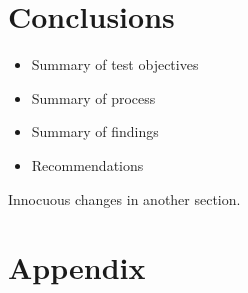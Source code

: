 \documentclass[conf]{new-aiaa}
\begin{document}
\section{Conclusions}

\begin{itemize}
	\item Summary of test objectives
	\item Summary of process
	\item Summary of findings
	\item Recommendations
\end{itemize}

Innocuous changes in another section.

\section{Appendix}
\end{document}
